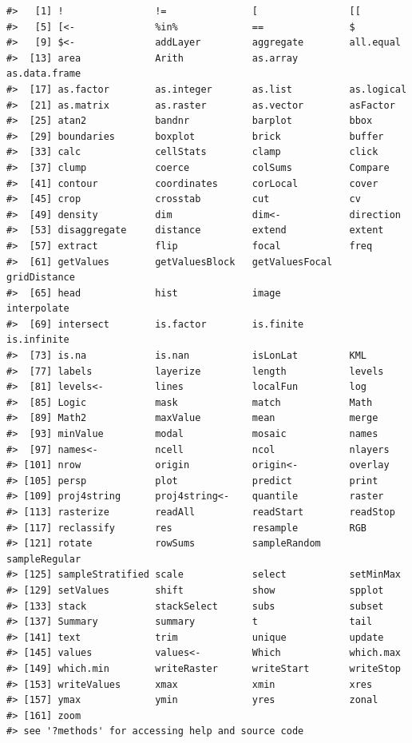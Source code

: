 \documentclass[]{book}
\theoremstyle{definition}
\theoremstyle{definition}
\theoremstyle{definition}
\theoremstyle{remark}
\begin{document}
\begin{verbatim}
#>   [1] !                !=               [                [[              
#>   [5] [<-              %in%             ==               $               
#>   [9] $<-              addLayer         aggregate        all.equal       
#>  [13] area             Arith            as.array         as.data.frame   
#>  [17] as.factor        as.integer       as.list          as.logical      
#>  [21] as.matrix        as.raster        as.vector        asFactor        
#>  [25] atan2            bandnr           barplot          bbox            
#>  [29] boundaries       boxplot          brick            buffer          
#>  [33] calc             cellStats        clamp            click           
#>  [37] clump            coerce           colSums          Compare         
#>  [41] contour          coordinates      corLocal         cover           
#>  [45] crop             crosstab         cut              cv              
#>  [49] density          dim              dim<-            direction       
#>  [53] disaggregate     distance         extend           extent          
#>  [57] extract          flip             focal            freq            
#>  [61] getValues        getValuesBlock   getValuesFocal   gridDistance    
#>  [65] head             hist             image            interpolate     
#>  [69] intersect        is.factor        is.finite        is.infinite     
#>  [73] is.na            is.nan           isLonLat         KML             
#>  [77] labels           layerize         length           levels          
#>  [81] levels<-         lines            localFun         log             
#>  [85] Logic            mask             match            Math            
#>  [89] Math2            maxValue         mean             merge           
#>  [93] minValue         modal            mosaic           names           
#>  [97] names<-          ncell            ncol             nlayers         
#> [101] nrow             origin           origin<-         overlay         
#> [105] persp            plot             predict          print           
#> [109] proj4string      proj4string<-    quantile         raster          
#> [113] rasterize        readAll          readStart        readStop        
#> [117] reclassify       res              resample         RGB             
#> [121] rotate           rowSums          sampleRandom     sampleRegular   
#> [125] sampleStratified scale            select           setMinMax       
#> [129] setValues        shift            show             spplot          
#> [133] stack            stackSelect      subs             subset          
#> [137] Summary          summary          t                tail            
#> [141] text             trim             unique           update          
#> [145] values           values<-         Which            which.max       
#> [149] which.min        writeRaster      writeStart       writeStop       
#> [153] writeValues      xmax             xmin             xres            
#> [157] ymax             ymin             yres             zonal           
#> [161] zoom            
#> see '?methods' for accessing help and source code
\end{verbatim}
\end{document}
